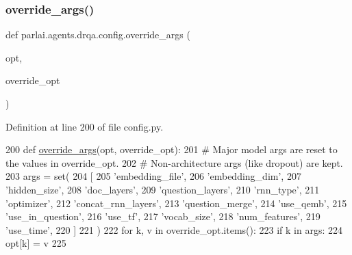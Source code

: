 \subsubsection{\texorpdfstring{override\+\_\+args()}{override\_args()}}
{\footnotesize\ttfamily def parlai.\+agents.\+drqa.\+config.\+override\+\_\+args (\begin{DoxyParamCaption}\item[{}]{opt,  }\item[{}]{override\+\_\+opt }\end{DoxyParamCaption})}



Definition at line 200 of file config.\+py.


\begin{DoxyCode}
200 \textcolor{keyword}{def }\hyperlink{namespaceparlai_1_1agents_1_1drqa_1_1config_a0fd9c7cd1129e5b4a7c0315b9f03c31a}{override\_args}(opt, override\_opt):
201     \textcolor{comment}{# Major model args are reset to the values in override\_opt.}
202     \textcolor{comment}{# Non-architecture args (like dropout) are kept.}
203     args = set(
204         [
205             \textcolor{stringliteral}{'embedding\_file'},
206             \textcolor{stringliteral}{'embedding\_dim'},
207             \textcolor{stringliteral}{'hidden\_size'},
208             \textcolor{stringliteral}{'doc\_layers'},
209             \textcolor{stringliteral}{'question\_layers'},
210             \textcolor{stringliteral}{'rnn\_type'},
211             \textcolor{stringliteral}{'optimizer'},
212             \textcolor{stringliteral}{'concat\_rnn\_layers'},
213             \textcolor{stringliteral}{'question\_merge'},
214             \textcolor{stringliteral}{'use\_qemb'},
215             \textcolor{stringliteral}{'use\_in\_question'},
216             \textcolor{stringliteral}{'use\_tf'},
217             \textcolor{stringliteral}{'vocab\_size'},
218             \textcolor{stringliteral}{'num\_features'},
219             \textcolor{stringliteral}{'use\_time'},
220         ]
221     )
222     \textcolor{keywordflow}{for} k, v \textcolor{keywordflow}{in} override\_opt.items():
223         \textcolor{keywordflow}{if} k \textcolor{keywordflow}{in} args:
224             opt[k] = v
225 \end{DoxyCode}
\mbox{\label{namespaceparlai_1_1agents_1_1drqa_1_1config_a8cc825bafeff299794cba6e2a8b65da2}} 
